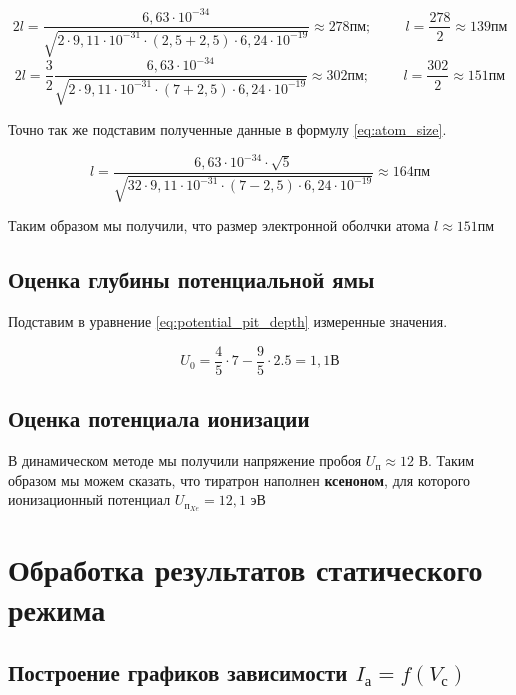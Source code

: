 \documentclass[12pt]{article}
\begin{document}
      $$
        2 l = \frac{6,63 \cdot 10^{-34}}{\sqrt{2 \cdot 9,11 \cdot 10^{-31} \cdot
        \left( 2,5 + 2,5 \right) \cdot 6,24 \cdot 10^{-19}}} \approx 278 пм;
        \hspace{1cm} l = \frac{278}{2} \approx 139 пм
      $$
      $$
        2 l = \frac{3}{2} \frac{6,63 \cdot 10^{-34}}{\sqrt{2 \cdot 9,11 \cdot
        10^{-31} \cdot \left( 7 + 2,5 \right) \cdot 6,24 \cdot 10^{-19}}}
        \approx 302 пм; \hspace{1cm} l = \frac{302}{2} \approx 151 пм
      $$

      Точно так же подставим полученные данные в формулу \ref{eq:atom_size}.

      $$
        l = \frac{6,63 \cdot 10^{-34} \cdot \sqrt{5}}{\sqrt{32 \cdot 9,11 \cdot
        10^{-31} \cdot \left( 7 - 2,5 \right) \cdot 6,24 \cdot 10^{-19}}}
        \approx 164 пм
      $$

      Таким образом мы получили, что размер электронной оболчки атома $l
      \approx 151 пм$

    \subsection{Оценка глубины потенциальной ямы}

      Подставим в уравнение \ref{eq:potential_pit_depth} измеренные значения.

      $$
        U_0 = \frac{4}{5} \cdot 7 - \frac{9}{5} \cdot 2.5 = 1,1 В
      $$

    \subsection{Оценка потенциала ионизации}

      В динамическом методе мы получили напряжение пробоя $U_п \approx 12$ В.
      Таким образом мы можем сказать, что тиратрон наполнен \textbf{ксеноном},
      для которого ионизационный потенциал $U_{п_{Xe}} = 12,1$ эВ

  \section{Обработка результатов статического режима}

    \subsection{Построение графиков зависимости $I_а = f(V_с)$}
\end{document}
